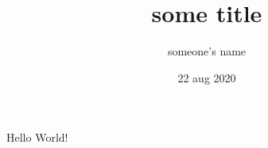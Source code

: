 \documentclass{article}
\title{some title}
\author{someone's name}
\date{22 aug 2020}
\begin{document}
\maketitle
Hello World!
\end{document}
